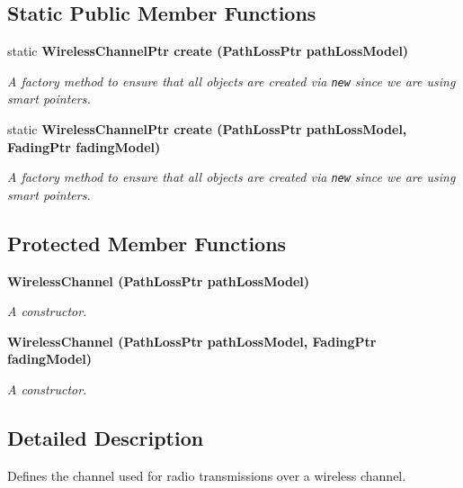 \subsection*{Static Public Member Functions}
\begin{CompactItemize}
\item 
static \bf{Wireless\-Channel\-Ptr} \bf{create} (Path\-Loss\-Ptr path\-Loss\-Model)
\begin{CompactList}\small\item\em A factory method to ensure that all objects are created via {\tt new} since we are using smart pointers. \item\end{CompactList}\item 
static \bf{Wireless\-Channel\-Ptr} \bf{create} (Path\-Loss\-Ptr path\-Loss\-Model, Fading\-Ptr fading\-Model)
\begin{CompactList}\small\item\em A factory method to ensure that all objects are created via {\tt new} since we are using smart pointers. \item\end{CompactList}\end{CompactItemize}
\subsection*{Protected Member Functions}
\begin{CompactItemize}
\item 
\bf{Wireless\-Channel} (Path\-Loss\-Ptr path\-Loss\-Model)
\begin{CompactList}\small\item\em A constructor. \item\end{CompactList}\item 
\bf{Wireless\-Channel} (Path\-Loss\-Ptr path\-Loss\-Model, Fading\-Ptr fading\-Model)
\begin{CompactList}\small\item\em A constructor. \item\end{CompactList}\end{CompactItemize}


\subsection{Detailed Description}
Defines the channel used for radio transmissions over a wireless channel. 



